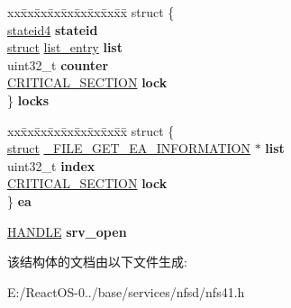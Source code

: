 \begin{DoxyCompactItemize}
\begin{tabbing}
\end{tabbing}\item 
\mbox{\label{struct____nfs41__open__state_a9ff7f0557b12de4802ef8f9b04ed1649}} 
\begin{tabbing}
xx\=xx\=xx\=xx\=xx\=xx\=xx\=xx\=xx\=\kill
struct \{\\
\>\hyperlink{struct____stateid4}{stateid4} {\bfseries stateid}\\
\>\hyperlink{interfacestruct}{struct} \hyperlink{structlist__entry}{list\_entry} {\bfseries list}\\
\>uint32\_t {\bfseries counter}\\
\>\hyperlink{struct___c_r_i_t_i_c_a_l___s_e_c_t_i_o_n}{CRITICAL\_SECTION} {\bfseries lock}\\
\} {\bfseries locks}\\

\end{tabbing}\item 
\mbox{\label{struct____nfs41__open__state_ab7e9031befc80dc4239437daae4d7cb8}} 
\begin{tabbing}
xx\=xx\=xx\=xx\=xx\=xx\=xx\=xx\=xx\=\kill
struct \{\\
\>\hyperlink{interfacestruct}{struct} \hyperlink{struct___f_i_l_e___g_e_t___e_a___i_n_f_o_r_m_a_t_i_o_n}{\_FILE\_GET\_EA\_INFORMATION} $\ast$ {\bfseries list}\\
\>uint32\_t {\bfseries index}\\
\>\hyperlink{struct___c_r_i_t_i_c_a_l___s_e_c_t_i_o_n}{CRITICAL\_SECTION} {\bfseries lock}\\
\} {\bfseries ea}\\

\end{tabbing}\item 
\mbox{\label{struct____nfs41__open__state_a88fafcaac3c190cf7b5bf11e4c5f8e26}} 
\hyperlink{interfacevoid}{H\+A\+N\+D\+LE} {\bfseries srv\+\_\+open}
\end{DoxyCompactItemize}


该结构体的文档由以下文件生成\+:\begin{DoxyCompactItemize}
\item 
E\+:/\+React\+O\+S-\/0../base/services/nfsd/nfs41.\+h\end{DoxyCompactItemize}
